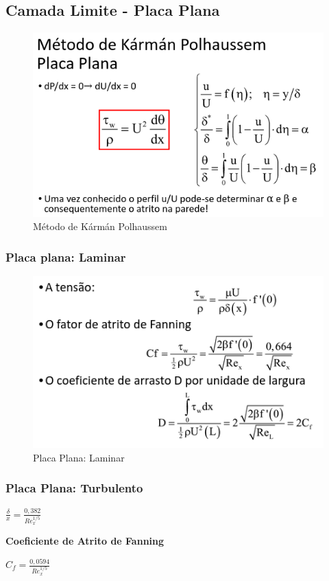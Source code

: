 \documentclass[a4paper, 12pt]{article}
\begin{document}
\subsection{Camada Limite - Placa Plana}
	\begin{figure}[h]
		\centering
		\includegraphics[width=0.6\linewidth]{imagens/a2}
		\caption{Método de Kármán Polhaussem}
		\label{fig:a2}
	\end{figure}
\newpage
\subsubsection{Placa plana: Laminar}
	\begin{figure}[h]
		\centering
		\includegraphics[width=0.7\linewidth]{imagens/pp}
		\caption{Placa Plana: Laminar}
		\label{fig:pp}
	\end{figure}

\subsubsection{Placa Plana: Turbulento}
	\begin{center}
		\Large
		$
		\frac{\delta}{x} = \frac{0,382}{Re^{1/5}_x}
		$
	\end{center}
	\textbf{Coeficiente de Atrito de Fanning}
	\begin{center}
		\Large
		$
		C_f = \frac{0,0594}{Re^{1/5}_x}
		$
	\end{center}
\end{document}
